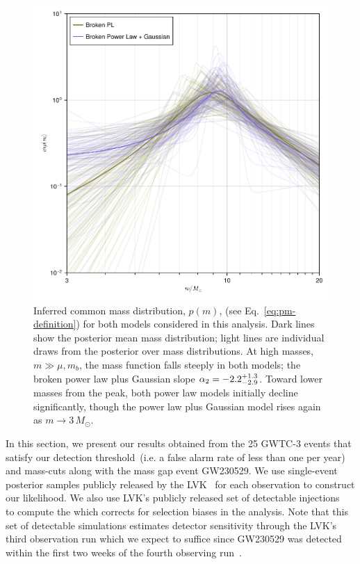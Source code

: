 \documentclass[modern]{aastex631}
\begin{document}
\begin{figure}
    \includegraphics[width=\columnwidth]{figures/pm_traces_including_230529.pdf}
    \caption{\label{fig:pm-traces_including_230529} Inferred common mass distribution, $p(m)$,
    (see Eq.~\eqref{eq:pm-definition}) for both models considered in this
    analysis.  Dark lines show the posterior mean mass distribution; light lines
    are individual draws from the posterior over mass distributions.  At high
    masses, $m \gg \mu, m_b$, the mass function falls steeply in both models;
    the broken power law plus Gaussian slope $\alpha_2 = -2.2^{+1.3}_{-2.9}$.
    Toward lower masses from the peak, both power law models initially decline
    significantly, though the power law plus Gaussian model rises again as $m
    \to 3 \, M_\odot$.}
\end{figure}

In this section, we present our results obtained from the 25 GWTC-3 events that
satisfy our detection threshold~(i.e. a false alarm rate of less than one per
year) and mass-cuts along with the mass gap event GW230529. We use single-event
posterior samples publicly released by the LVK~\citep{gwosco3, gwosco4} for each
observation to construct our likelihood. We also use LVK's publicly released set
of detectable injections~\citep{gwosco3} to compute the
\chreplaced[id=W]{}{} which corrects for selection biases in the
analysis. Note that this set of detectable simulations estimates detector
sensitivity \chreplaced[id=W]{}{} through the LVK's third observation run
which we expect to suffice since GW230529 was detected within the first two
weeks of the fourth observing run~\citep{LIGOScientific:2024elc}.
\end{document}
